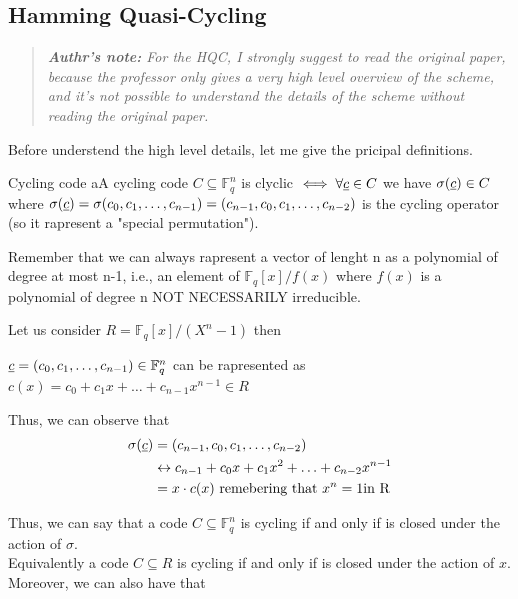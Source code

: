 \newpage
\subsection{Hamming Quasi-Cycling}
\begin{quotation}
    \textit{\textbf{Authr's note:} For the HQC, I strongly suggest to read the original paper, because the professor only gives a very high level overview of the scheme, and it's not possible to understand the details of the scheme without reading the original paper.}
\end{quotation}

\noindent
Before understend the high level details, let me give the pricipal definitions.

\begin{defBox}{Cycling code}
    aA cycling code $C \subseteq \mathbb{F}_q^n$ is clyclic $\iff \forall \underline{c} \in C$ we have $\sigma(\underline{c}) \in C$ where $\sigma(\underline{c}) = \sigma(c_0, c_1, \ldots, c_{n-1}) = (c_{n-1}, c_0, c_1, \ldots, c_{n-2})$ is the cycling operator (so it rapresent a "special permutation").
\end{defBox}

\noindent
Remember that we can always rapresent a vector of lenght n as a polynomial of degree at most n-1, i.e., an element of $\mathbb{F}_q[x]/f(x)$ where $f(x)$ is a polynomial of degree n NOT NECESSARILY irreducible.
\medskip

\noindent
Let us consider $R = \mathbb{F}_q[x] / (X^n - 1)$ then 
\begin{center}
    $\underline{c} = (c_0, c_1, \ldots, c_{n-1}) \in \mathbb{F}_q^n$ can be rapresented as $c(x) = c_0 + c_1x + \ldots + c_{n-1}x^{n-1} \in R$
\end{center}

\noindent
Thus, we can observe that 
\begin{align*}
    \sigma(\underline{c}) &= (c_{n-1}, c_0, c_1, \ldots, c_{n-2}) \\
    &\leftrightarrow c_{n-1} + c_0x + c_1x^2 + \ldots + c_{n-2}x^{n-1} \\
    &= x \cdot c(x) \text{ remebering that } x^n = 1 \text{in R}
\end{align*}

\noindent
Thus, we can say that a code $C \subseteq \mathbb{F}_q^n$ is cycling if and only if is closed under the action of $\sigma$.\\
Equivalently a code $C \subseteq R$ is cycling if and only if is closed under the action of $x$.\\
Moreover, we can also have that

